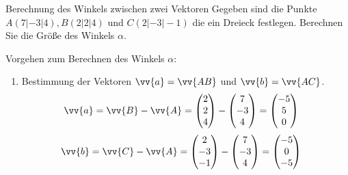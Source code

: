 \begin{bsp}{Berechnung des Winkels zwischen zwei Vektoren}{}
Gegeben sind die Punkte $A(7|-3|4), B(2|2|4)$ und $C(2|-3|-1)$ die ein Dreieck festlegen. Berechnen Sie die Größe des Winkels $\alpha$.
\begin{center}
\end{center}
Vorgehen zum Berechnen des Winkels $\alpha$:
\begin{enumerate}
    \item Bestimmung der Vektoren $\vv{a} = \vv{AB}$ und $\vv{b} = \vv{AC}$.
    \begin{equation*}
        \begin{split}
            \vv{a} &= \vv{B} - \vv{A} = \begin{pmatrix} 2 \\2 \\4\end{pmatrix} -\begin{pmatrix} 7 \\-3 \\4\end{pmatrix} = \begin{pmatrix} -5 \\5\\0\end{pmatrix} 
            \end{split}
            \end{equation*}
    \begin{equation*}
        \begin{split}
            \vv{b} &= \vv{C} - \vv{A} = \begin{pmatrix} 2 \\-3 \\-1\end{pmatrix} -\begin{pmatrix} 7 \\-3 \\4\end{pmatrix} = \begin{pmatrix} -5 \\0\\-5\end{pmatrix} 
            \end{split}
            \end{equation*}
                

\end{enumerate}
\end{bsp}

